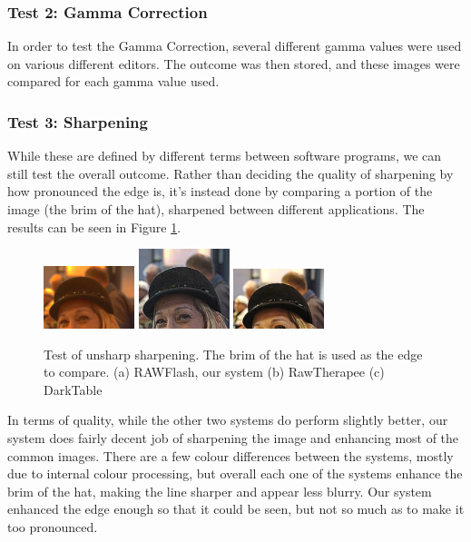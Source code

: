 \documentclass[10pt,a4paper]{article}
\begin{document}
\subsubsection{Test 2: Gamma Correction}
In order to test the Gamma Correction, several different gamma values were used on various different editors.
The outcome was then stored, and these images were compared for each gamma value used.


\subsubsection{Test 3: Sharpening}
While these are defined by different terms between software programs, we can still test the overall outcome.
Rather than deciding the quality of sharpening by how pronounced the edge is, it's instead done by comparing a portion
of the image (the brim of the hat), sharpened between different applications. The results can be seen in Figure \ref{unsharpcomparison}.

\begin{figure}\label{unsharpcomparison}
    \centering
    \subfigure
    {
        \includegraphics[width=100px]{rawflash_hat_sharp}
    }
    \subfigure
    {
        \includegraphics[width=100px]{rawtherapee_unsharp_max}
    }
    \subfigure
    {
        \includegraphics[width=100px]{darktable_unsharp}
    }
    \caption{
        Test of unsharp sharpening. The brim of the hat is used as the edge to compare. 
        (a) RAWFlash, our system
        (b) RawTherapee
        (c) DarkTable
    }
 \end{figure}


In terms of quality, while the other two systems do perform slightly better, our system does fairly decent job of sharpening
the image and enhancing most of the common images. There are a few colour differences between the systems, mostly due to internal
colour processing, but overall each one of the systems enhance the brim of the hat, making the line sharper and appear less blurry. 
Our system enhanced the edge enough so that it could be seen, but not so much as to make it too pronounced.
\end{document}
